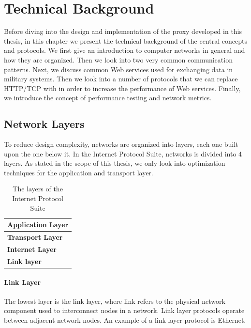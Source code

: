 \chapter{Technical Background}

\label{chapter:background}



Before diving into the design and implementation of the proxy developed in this
thesis, in this chapter we present the technical background of the central
concepts and protocols. We first give an introduction to computer networks in
general and how they are organized. Then we look into two very common
communication patterns. Next, we discuss common Web services used for exchanging
data in military systems. Then we look into a number of protocols that we can
replace HTTP/TCP with in order to increase the performance of Web services.
Finally, we introduce the concept of performance testing and network metrics.

\section{Network Layers}

To reduce design complexity, networks are organized into layers, each one built
upon the one below it. In the Internet Protocol Suite\cite{rfc-1122}, networks
is divided into 4 layers. As stated in the scope of this thesis, we only look
into optimization techniques for the application and transport layer.

\begin{table}[h]
\begin{tabularx}{\textwidth}{| X |}
\hline
  \textbf{Application Layer} \\ \hline
  \textbf{Transport Layer} \\ \hline
  \textbf{Internet Layer} \\ \hline
  \textbf{Link layer} \\ \hline
\end{tabularx}
\caption{The layers of the Internet Protocol Suite}
\label{figure-network-layers}
\end{table}

\subsubsection{Link Layer}

The lowest layer is the link layer, where link refers to the physical
network component used to interconnect nodes in a network. Link layer protocols
operate between adjacent network nodes. An example of a link layer protocol is
Ethernet.

